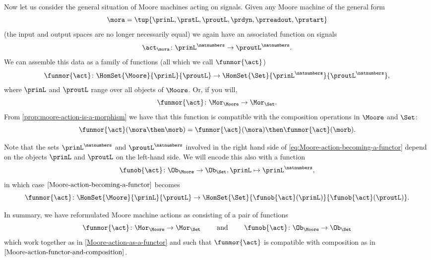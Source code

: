 Now let us consider the general situation of Moore machines acting on signals. Given any Moore machine of the general form 
$$\mora = \tup{\prinL,\prstL,\proutL,\prdyn,\prreadout,\prstart}$$ 
(the input and output spaces are no longer necessarily equal) we again have an associated function on signals
\begin{equation}
\act_{\mora} \colon {\prinL}^\natnumbers \to {\proutL}^\natnumbers.
\end{equation}
We can assemble this data as a family of functions (all which we call $\funmor{\act}$)
\begin{equation}
\label{eq:Moore-action-becoming-a-functor}
\funmor{\act} \colon  \HomSet{\Moore}{\prinL}{\proutL} \to \HomSet{\Set}{\prinL^{\natnumbers}}{\proutL^{\natnumbers}},
\end{equation}
where $\prinL$ and $\proutL$ range over all objects of $\Moore$. Or, if you will, 
$$
\funmor{\act} \colon \Mor_\Moore \to \Mor_\Set.
$$
From \cref{prop:moore-action-is-a-morphism} we have that this function is compatible with the composition operations in $\Moore$ and $\Set$: 
\begin{equation}
\label{eq:Moore-action-functor-and-composition}
\funmor{\act}(\mora \then \morb) = \funmor{\act}(\mora) \then \funmor{\act}(\morb). 
\end{equation}
 

Note that the sets $\prinL^{\natnumbers}$ and $\proutL^{\natnumbers}$ involved in the right hand side of \cref{eq:Moore-action-becoming-a-functor} depend on the objects $\prinL$ and $\proutL$ on the left-hand side. We will encode this also with a function 
\begin{equation}
\funob{\act} \colon \Ob_{\Moore} \to \Ob_{\Set}, \prinL \mapsto \prinL^\natnumbers,
\end{equation}
in which case $\cref{Moore-action-becoming-a-functor}$ becomes
\begin{equation}
\label{eq:Moore-action-as-a-functor}
\funmor{\act} \colon  \HomSet{\Moore}{\prinL}{\proutL} \to \HomSet{\Set}{ \funob{\act}(\prinL)}{\funob{\act}(\proutL)}.
\end{equation}

In summary, we have reformulated Moore machine actions as consisting of a pair of functions 
\begin{equation}
\funmor{\act} \colon \Mor_\Moore \to \Mor_\Set \qquad \text{ and } \qquad \funob{\act} \colon \Ob_{\Moore} \to \Ob_{\Set}
\end{equation}
which work together as in \cref{Moore-action-as-a-functor} and such that $\funmor{\act}$ is compatible with composition as in $\cref{Moore-action-functor-and-composition}$. 

